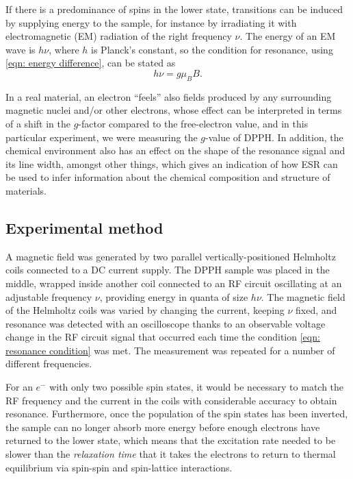\documentclass[a4paper]{jpconf}
\numberwithin{equation}{section}
\begin{document}
If there is a predominance of spins in the lower state, transitions can be induced by supplying energy to the sample, for instance by irradiating it with electromagnetic (EM) radiation of the right frequency $\nu$. The energy of an EM wave is $h \nu$, where $h$ is Planck's constant, so the condition for resonance, using \eqref{eqn: energy difference}, can be stated as
\begin{equation}
	h\nu = g\mu_B B. \label{eqn: resonance condition}
\end{equation}

In a real material, an electron ``feels'' also fields produced by any surrounding magnetic nuclei and/or other electrons, whose effect can be interpreted in terms of a shift in the $g$-factor compared to the free-electron value, and in this particular experiment, we were measuring the $g$-value of DPPH. In addition, the chemical environment also has an effect on the shape of the resonance signal and its line width, amongst other things, which gives an indication of how ESR can be used to infer information about the chemical composition and structure of materials. 

\subsection{Experimental method}\label{section: method}
A magnetic field was generated by two parallel vertically-positioned Helmholtz coils connected to a DC current supply. The DPPH sample was placed in the middle, wrapped inside another coil connected to an RF circuit oscillating at an adjustable frequency $\nu$, providing energy in quanta of size $h\nu$. The magnetic field of the Helmholtz coils was varied by changing the current, keeping $\nu$ fixed, and resonance was detected with an oscilloscope thanks to an observable voltage change in the RF circuit signal that occurred each time the condition \eqref{eqn: resonance condition} was met. The measurement was repeated for a number of different frequencies.  

For an $e^-$ with only two possible spin states, it would be necessary to match the RF frequency and the current in the coils with considerable accuracy to obtain resonance. Furthermore, once the population of the spin states has been inverted, the sample can no longer absorb more energy before enough electrons have returned to the lower state, which means that the excitation rate needed to be slower than the \emph{relaxation time} that it takes the electrons to return to thermal equilibrium via spin-spin and spin-lattice interactions. 
\end{document}
